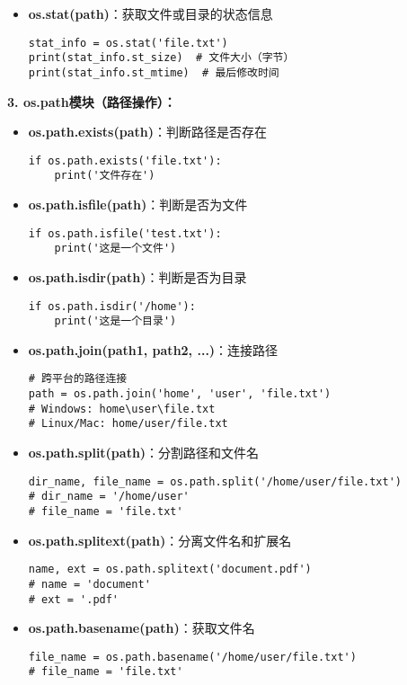 \begin{mdframed}
\begin{itemize}
    \item \textbf{os.stat(path)}：获取文件或目录的状态信息
    \begin{lstlisting}
stat_info = os.stat('file.txt')
print(stat_info.st_size)  # 文件大小（字节）
print(stat_info.st_mtime)  # 最后修改时间
    \end{lstlisting}
  \end{itemize}

  \textbf{3. os.path模块（路径操作）：}
  \begin{itemize}
    \item \textbf{os.path.exists(path)}：判断路径是否存在
    \begin{lstlisting}
if os.path.exists('file.txt'):
    print('文件存在')
    \end{lstlisting}

    \item \textbf{os.path.isfile(path)}：判断是否为文件
    \begin{lstlisting}
if os.path.isfile('test.txt'):
    print('这是一个文件')
    \end{lstlisting}

    \item \textbf{os.path.isdir(path)}：判断是否为目录
    \begin{lstlisting}
if os.path.isdir('/home'):
    print('这是一个目录')
    \end{lstlisting}

    \item \textbf{os.path.join(path1, path2, ...)}：连接路径
    \begin{lstlisting}
# 跨平台的路径连接
path = os.path.join('home', 'user', 'file.txt')
# Windows: home\user\file.txt
# Linux/Mac: home/user/file.txt
    \end{lstlisting}

    \item \textbf{os.path.split(path)}：分割路径和文件名
    \begin{lstlisting}
dir_name, file_name = os.path.split('/home/user/file.txt')
# dir_name = '/home/user'
# file_name = 'file.txt'
    \end{lstlisting}

    \item \textbf{os.path.splitext(path)}：分离文件名和扩展名
    \begin{lstlisting}
name, ext = os.path.splitext('document.pdf')
# name = 'document'
# ext = '.pdf'
    \end{lstlisting}

    \item \textbf{os.path.basename(path)}：获取文件名
    \begin{lstlisting}
file_name = os.path.basename('/home/user/file.txt')
# file_name = 'file.txt'
    \end{lstlisting}


\end{itemize}
\end{mdframed}
